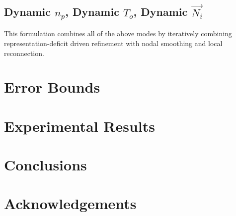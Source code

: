 \documentclass[11pt]{article}
\begin{document}
\subsection{Dynamic $n_p$, Dynamic $T_o$, Dynamic $\vec{N_i}$}
This formulation combines all of the above modes by iteratively
combining representation-deficit driven refinement with nodal smoothing
and local reconnection.

\section{Error Bounds}
\section{Experimental Results}
\section{Conclusions}
\section{Acknowledgements}
\end{document}
